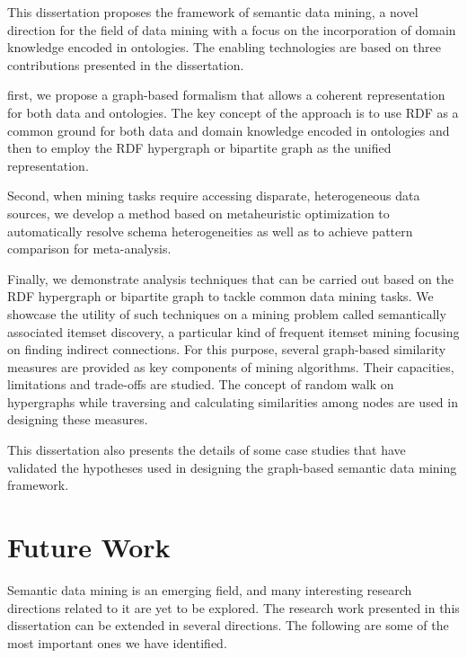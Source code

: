 This dissertation proposes the framework of semantic data mining, a novel direction for the field of data mining with a focus on the incorporation of domain knowledge encoded in ontologies. The enabling technologies are based on three contributions presented in the dissertation.

first, we propose a graph-based formalism that allows a coherent representation for both data and ontologies. The key concept of the approach is to use RDF as a common ground for both data and domain knowledge encoded in ontologies and then to employ the RDF hypergraph or bipartite graph as the unified representation.

Second, when mining tasks require accessing disparate, heterogeneous data sources, we develop a method based on metaheuristic optimization to automatically resolve schema heterogeneities as well as to achieve pattern comparison for meta-analysis.

Finally, we demonstrate analysis techniques that can be carried out based on the RDF hypergraph or bipartite graph to tackle common data mining tasks. We showcase the utility of such techniques on a mining problem called semantically associated itemset discovery, a particular kind of frequent itemset mining focusing on finding indirect connections. For this purpose, several graph-based similarity measures are provided as key components of mining algorithms. Their capacities, limitations and trade-offs are studied. The concept of random walk on hypergraphs while traversing and calculating similarities among nodes are used in designing these measures.

This dissertation also presents the details of some case studies that have validated the hypotheses used in designing the graph-based semantic data mining framework.

\section{Future Work}
Semantic data mining is an emerging field, and many interesting research directions related to it are yet to be explored. The research work presented in this dissertation can be extended in several directions. The following are some of the most important ones we have identified.

